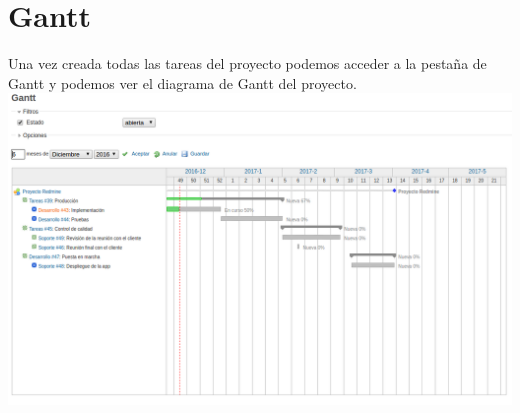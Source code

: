 \documentclass[a4paper,10pt]{scrartcl}
\begin{document}
\newpage
\section{Gantt}

Una vez creada todas las tareas del proyecto podemos acceder a la pestaña de Gantt y podemos ver el diagrama de Gantt del proyecto.\\

\includegraphics[width=15cm]{gantt}


\end{document}
